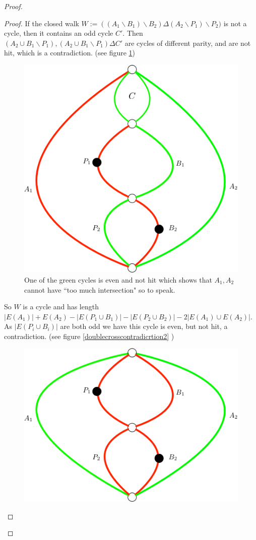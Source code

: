 \documentclass[letterpaper,11pt]{article}
\newcommand{\0}{\mathbb{0}}
\newcommand{\1}{\mathbb{1}}
\begin{document}
\begin{proof}
\begin{proof}
If the closed walk  $ W:= (( A_1 \backslash B_1 ) \backslash B_2 )   \Delta ( A_2 \backslash P_1 ) \backslash P_2 )  $  is not a cycle, then it contains an odd cycle $C'$. Then $ (A_2 \cup B_1 \backslash P_1), (A_2 \cup B_1 \backslash P_1) \Delta C'$ are cycles of different parity, and are not hit, which is a contradiction. (see figure \ref{doublecrosscontradiction3})
\begin{figure}[h]
    \includegraphics[scale=0.3]{DoubleCrossContradiction3.png}
    \caption{One of the green cycles is even and not hit which shows that $A_1,A_2$ cannot have ``too much intersection" so to speak.}
    \label{doublecrosscontradiction3}
\end{figure}
So $W$ is a cycle 
and has length $ |E(A_1) | + E(A_2) - |E(P_1 \cup B_1) | - |E(P_2 \cup B_2 ) |  -2 |E(A_1) \cup E(A_2) | $. As $|E(P_i \cup B_i) |$   are both odd we have this cycle is even, but not hit, a contradiction. (see figure \ref{doublecrosscontradicrtion2} )  
\begin{figure}[h]
    \includegraphics[scale=0.3]{DoubleCrossContradiction2}  

\end{figure}
\end{proof}
\end{proof}
\end{document}
